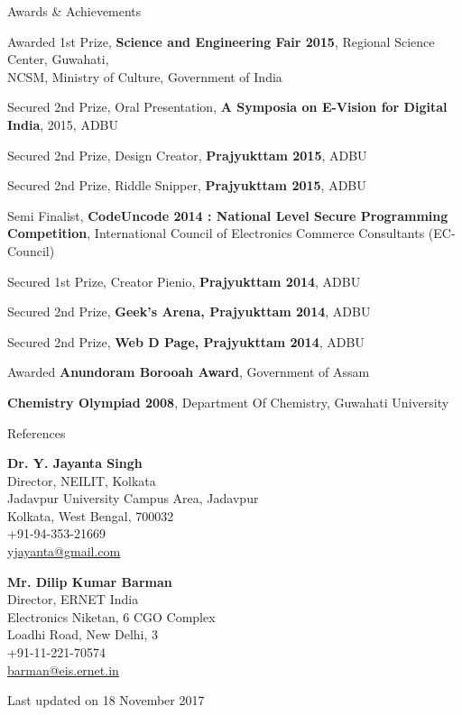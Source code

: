 \documentclass{resume}
\begin{document}
\begin{rSection}{Awards \& Achievements}
	
	\item Awarded 1st Prize, \textbf{Science and Engineering Fair 2015}, Regional Science Center, Guwahati,\\NCSM, Ministry of Culture, Government of India
	\item Secured 2nd Prize, Oral Presentation, \textbf{A Symposia on E-Vision for Digital India}, 2015, ADBU
	\item Secured 2nd Prize, Design Creator, \textbf{Prajyukttam 2015}, ADBU
	\item Secured 2nd Prize, Riddle Snipper, \textbf{Prajyukttam 2015}, ADBU
	\item Semi Finalist, \textbf{CodeUncode 2014 : National Level Secure Programming Competition}, International Council of Electronics Commerce Consultants (EC-Council)
	\item Secured 1st Prize, Creator Pienio, \textbf{Prajyukttam 2014}, ADBU
	\item Secured 2nd Prize, \textbf{Geek's Arena, Prajyukttam 2014}, ADBU
	\item Secured 2nd Prize, \textbf{Web D Page, Prajyukttam 2014}, ADBU
	\item Awarded \textbf{Anundoram Borooah Award}, Government of Assam \item \textbf{Chemistry Olympiad 2008}, Department Of Chemistry, Guwahati University
	    
\end{rSection}

\begin{rSection}{References}
	
	\begin{minipage}[t]{0.5\textwidth}
		\textbf{Dr. Y. Jayanta Singh}\\
		Director, NEILIT, Kolkata\\
		Jadavpur University Campus Area, Jadavpur\\
		Kolkata, West Bengal, 700032\\
		+91-94-353-21669\\
		\href{mailto:yjayanta@gmail.com}{yjayanta@gmail.com}
	\end{minipage}
	\begin{minipage}[t]{0.5\textwidth}
		\textbf{Mr. Dilip Kumar Barman}\\
		Director, ERNET India\\
		Electronics Niketan, 6 CGO Complex\\
		Loadhi Road, New Delhi, 3\\
		+91-11-221-70574\\
		\href{mailto:barman@eis.ernet.in}{barman@eis.ernet.in}
	\end{minipage}
	    
	\begin{rSubsection}{}{}
		{}{}
		\item \small{Last updated on 18 November 2017}
	\end{rSubsection}
	    
\end{rSection}
\end{document}

